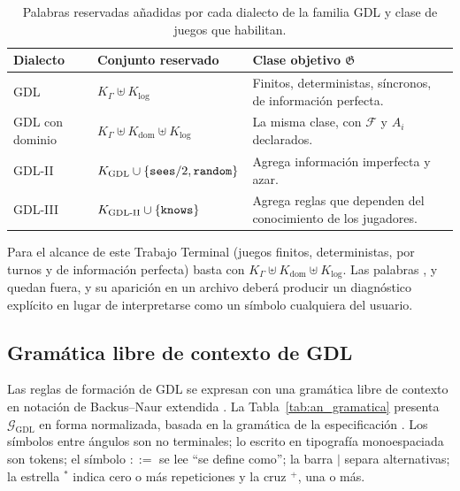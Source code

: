 \begin{table}[htbp]
\centering
\small
\caption{Palabras reservadas añadidas por cada dialecto de la familia GDL y clase de juegos que habilitan.}
\label{tab:an_dialectos}
\begin{tabularx}{\textwidth}{@{}l l Y@{}}
\toprule
\textbf{Dialecto} & \textbf{Conjunto reservado} & \textbf{Clase objetivo $\mathfrak G$} \\
\midrule
GDL \cite{Love2008GDL} & $K_\Gamma \uplus K_{\mathrm{log}}$ & Finitos, deterministas, síncronos, de información perfecta. \\
GDL con dominio \cite{GeneserethThielscher2014} & $K_\Gamma \uplus K_{\mathrm{dom}} \uplus K_{\mathrm{log}}$ & La misma clase, con $\mathcal F$ y $A_i$ declarados. \\
GDL-II \cite{Thielscher2010GDLII} & $K_{\mathrm{GDL}} \cup \{\texttt{sees}/2, \texttt{random}\}$ & Agrega información imperfecta y azar. \\
GDL-III \cite{Thielscher2017GDLIII} & $K_{\mathrm{GDL\text{-}II}} \cup \{\texttt{knows}\}$ & Agrega reglas que dependen del conocimiento de los jugadores. \\
\bottomrule
\end{tabularx}
\end{table}

Para el alcance de este Trabajo Terminal (juegos finitos, deterministas, por turnos y de información perfecta) basta con $K_\Gamma \uplus K_{\mathrm{dom}} \uplus K_{\mathrm{log}}$. Las palabras ,  y  quedan fuera, y su aparición en un archivo deberá producir un diagnóstico explícito en lugar de interpretarse como un símbolo cualquiera del usuario.

\subsection{Gramática libre de contexto de GDL}

Las reglas de formación de GDL se expresan con una gramática libre de contexto en notación de Backus--Naur extendida \cite{HopcroftMotwaniUllman2006}. La Tabla~\ref{tab:an_gramatica} presenta $\mathcal G_{\mathrm{GDL}}$ en forma normalizada, basada en la gramática de la especificación \cite{Love2008GDL}. Los símbolos entre ángulos son no terminales; lo escrito en tipografía monoespaciada son tokens; el símbolo $::=$ se lee ``se define como''; la barra $\mid$ separa alternativas; la estrella $^*$ indica cero o más repeticiones y la cruz $^+$, una o más.

